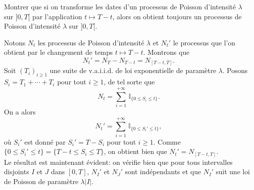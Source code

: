 \documentclass[11pt, answers]{exam}
\newcommand{\Prob}{\mathbb P}
\newcommand{\Ind}{\mathbb I}
\begin{document}
\begin{questions}


\question
  Montrer que si on transforme les dates d'un processus de Poisson d'intensité $\lambda$ sur $]0,T[$ par l'application $t\mapsto T-t$, alors on obtient toujours un processus de Poisson d'intensité $\lambda$ sur $]0,T[$.
  \begin{solution}
	Notons $N_t$ les processus de Poisson d'intensité $\lambda$ et $N_t'$ le processus que l'on obtient par le changement de temps $t\mapsto T-t$. Montrons que
\[N_t'=N_T-N_{T-t}=N_{[T-t,T]}.\]
Soit $(T_i)_{i\geq1}$ une suite de v.a.i.i.d. de loi exponentielle de paramètre $\lambda$. Posons $S_i=T_1+\cdots +T_i$ pour tout $i\geq1$, de tel sorte que
\[N_t=\sum_{i=1}^{+\infty}\,\Ind_{\{0\leq S_i\leq t\}}.\]
On a alors
\[N_t'=\sum_{i=1}^{+\infty}\,\Ind_{\{0\leq S_i'\leq t\}},\]
où $S_i'$ est donné par $S_i'=T-S_i$ pour tout $i\geq1$. Comme $\{0\leq S_i'\leq t\}=\{T-t\leq S_i\leq T\}$, on obtient bien que $N_t'=N_{[T-t,T]}$.\\
Le résultat est maintenant évident: on vérifie bien que pour tous intervalles disjoints $I$ et $J$ dans $[0,T]$, $N_I'$ et $N_J'$ sont indépendants et que $N_I'$ suit une loi de Poisson de paramètre $\lambda|I|$.
  \end{solution}


\end{questions}
\end{document}
